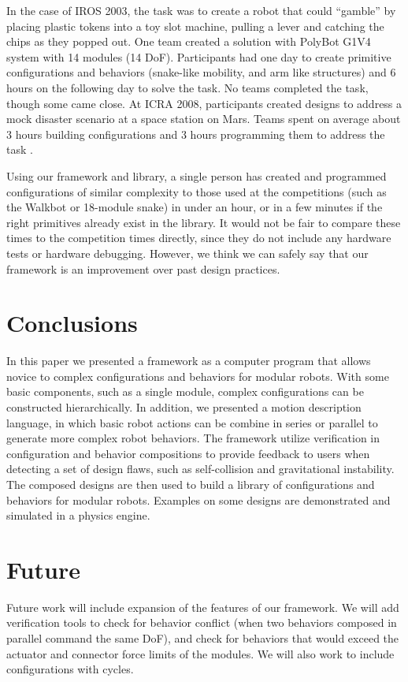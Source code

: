\documentclass[conference]{IEEEtran}
\theoremstyle{definition}
\begin{document}
In the case of IROS 2003, the task was to create a robot that could ``gamble'' by placing plastic tokens into a toy slot machine, pulling a lever and catching the chips as they popped out.  One team created a solution with PolyBot G1V4 system with 14 modules (14 DoF). Participants
had one day to create primitive configurations and behaviors (snake-like mobility, and arm like structures) and
 6 hours on the following day to solve the task. No teams completed the task, though
some came close. 
At ICRA 2008, participants created designs to address a mock disaster scenario
at a space station on Mars. Teams spent on average about 3 hours building configurations and
3 hours programming them to address the task \cite{sastra2011using}.  
  
Using our framework and library, a single person has created and programmed   configurations of similar complexity to those used at
the competitions (such as the Walkbot or 18-module snake)
in under an hour,
or in a few minutes if the right primitives already exist in the library. It would
not be fair to compare these times to the competition times directly, since they do not include any
hardware tests or hardware debugging. However, we think we can safely say that
our framework is an improvement over past design practices.
\section{Conclusions}
In this paper we presented a framework as a computer program that allows novice to complex configurations and behaviors for modular robots.
With some basic components, such as a single module, complex configurations can be constructed hierarchically.
In addition, we presented a motion description language, in which basic robot actions can be combine in series or parallel to generate more complex robot behaviors.
The framework utilize verification in configuration and behavior compositions to provide feedback to users when detecting a set of design flaws, such as self-collision and gravitational instability. The composed designs are then used to build a library of configurations and behaviors for modular robots. Examples on some designs are demonstrated and simulated in a physics engine.

\section{Future}
Future work will include expansion of the features of our framework.  We will add verification tools to check for behavior conflict (when two behaviors composed in parallel command the same DoF), and check for behaviors that would exceed the actuator and connector force limits of the modules.  We will also work to include configurations with cycles.
\end{document}

